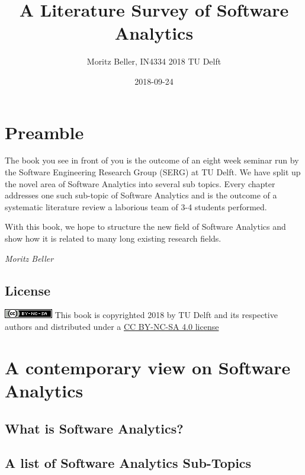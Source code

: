 \documentclass[]{book}
\title{A Literature Survey of Software Analytics}
\author{Moritz Beller, IN4334 2018 TU Delft}
\date{2018-09-24}
\begin{document}
\maketitle

{
\setcounter{tocdepth}{1}
\tableofcontents
}
\chapter{Preamble}\label{intro}

The book you see in front of you is the outcome of an eight week seminar
run by the Software Engineering Research Group (SERG) at TU Delft. We
have split up the novel area of Software Analytics into several sub
topics. Every chapter addresses one such sub-topic of Software Analytics
and is the outcome of a systematic literature review a laborious team of
3-4 students performed.

With this book, we hope to structure the new field of Software Analytics
and show how it is related to many long existing research fields.

\emph{Moritz Beller}

\section{License}\label{license}

\includegraphics{figures/cc-nc-sa.png} This book is copyrighted 2018 by
TU Delft and its respective authors and distributed under a
\href{https://creativecommons.org/licenses/by-nc-sa/4.0/}{CC BY-NC-SA
4.0 license}

\chapter{A contemporary view on Software
Analytics}\label{a-contemporary-view-on-software-analytics}

\section{What is Software Analytics?}\label{what-is-software-analytics}

\section{A list of Software Analytics
Sub-Topics}\label{a-list-of-software-analytics-sub-topics}
\end{document}
